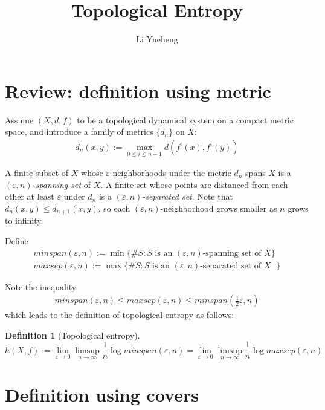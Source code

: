 \documentclass{article}
\newtheorem{definition}{Definition}
\begin{document}
\title{Topological Entropy}
\author{Li Yueheng}

\maketitle


\section{Review: definition using metric}

Assume $(X,d,f)$ to be a topological dynamical system on a compact metric space, and introduce a family of metrics $\{d_n\}$ on $X$:
\begin{align*}
	d_n(x,y):=\max_{0\leq i\leq n-1}d(f^i(x),f^i(y))
\end{align*}

A finite subset of $X$ whose $\varepsilon$-neighborhoods under the metric $d_n$ spans $X$ is a \emph{ $(\varepsilon,n)$-spanning set} of $X$. A finite set whose points are distanced from each other at least $\varepsilon$ under $d_n$ is a\emph{ $(\varepsilon,n)$-separated set}. Note that $d_n(x,y)\leq d_{n+1}(x,y)$, so each $(\varepsilon,n)$-neighborhood grows smaller as $n$ grows to infinity.

Define 
\begin{align*}
	minspan(\varepsilon,n ):=\min\{\#S:\text{$S$ is an $(\varepsilon,n )$-spanning set of $X$}\} \\
	maxsep(\varepsilon,n ):=\max\{\#S:\text{$S$ is an $(\varepsilon,n )$-separated set of $X$ }\}
\end{align*}

Note the inequality 
\begin{align*}
	minspan(\varepsilon,n )\leq maxsep(\varepsilon,n )\leq minspan(\frac{1}{2}\varepsilon,n )
\end{align*}
which leads to the definition of topological entropy as follows:
\begin{definition}[Topological entropy]
$$h(X,f):=\lim_{\varepsilon\rightarrow0}\limsup_{n\rightarrow\infty}\frac{1}{n}\log minspan(\varepsilon,n )=\lim_{\varepsilon\rightarrow0}\limsup_{n\rightarrow\infty}\frac{1}{n}\log  maxsep(\varepsilon,n )$$
\end{definition}



\section{Definition using covers}
\end{document}

